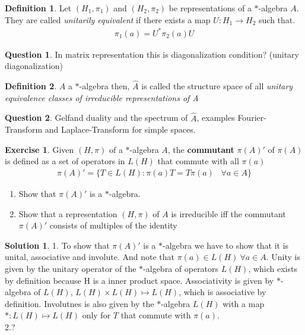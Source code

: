 \documentclass[a4paper]{article}
\theoremstyle{definition}
\newtheorem{definition}{Definition}
\theoremstyle{definition}
\newtheorem{question}{Question}
\theoremstyle{theorem}
\theoremstyle{theorem}
\newtheorem{exercise}{Exercise}
\theoremstyle{definition}
\newtheorem{solution}{Solution}
\begin{document}
\begin{definition}
    Let $(H_1, \pi _1)$ and $(H_2, \pi _2)$ be representations of a $*$-algebra $A$. They are called
    \textit{unitarily equivalent} if there exists a map $U: H_1 \rightarrow H_2$ such that.
    \begin{align*}
        \pi _1(a) = U^* \pi _2(a) U
    \end{align*}
\end{definition}

\begin{question}
    In matrix representation this is diagonalization condition? (unitary diagonalization)
\end{question}

\begin{definition}
    $A$ a $*$-algebra then, $\hat{A}$ is called the structure space of all \textit{unitary equivalence classes
    of irreducible representations of A}
\end{definition}

\begin{question}
    Gelfand duality and the spectrum of $\hat{A}$, examples Fourier-Transform and Laplace-Transform
    for simple spaces.
\end{question}

\begin{exercise}
    Given $(H, \pi)$ of a $*$-algebra $A$, the \textbf{commutant} $\pi (A)'$ of $\pi (A)$ is defined as a set
    of operators in $L(H)$ that commute with all $\pi (a)$
    \begin{align*}
        \pi (A)' = \{T \in L(H):\pi (a)T = T\pi (a) \;\;\; \forall a\in A\}
    \end{align*}
    \begin{enumerate}
        \item Show that $\pi (A)'$ is a $*$-algebra.
        \item Show that a representation $(H, \pi)$ of $A$ is irreducible iff the commutant $\pi (A)'$
                consists of multiples of the identity
    \end{enumerate}
\end{exercise}
\begin{solution}
    1. To show that $\pi (A)'$ is a $*$-algebra we have to show that it is unital, associative and involute.
    And note that $\pi (a) \in L(H)\ \forall a \in A$.
    Unity is given by the unitary operator of the $*$-algebra of operators $L(H)$, which exists by definition
    because H is a inner product space. Associativity is given by $*$-algebra of $L(H)$, $L(H) \times L(H) \mapsto L(H)$,
    which is associative by definition. Involutnes is also given by the $*$-algebra $L(H)$
    with a map $*: L(H) \mapsto L(H)$ only for $T$ that commute with $\pi (a)$.
    \\
    2.?
\end{solution}
\end{document}
